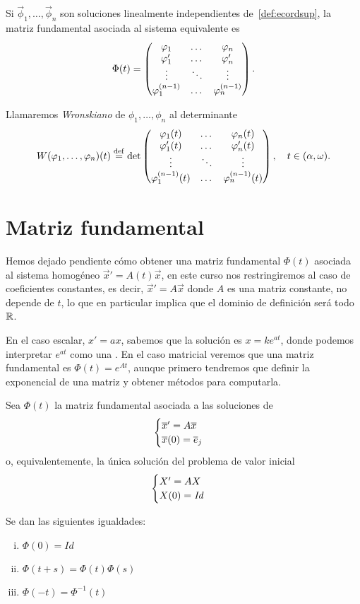\documentclass[../ecuaciones_diferenciales.tex]{subfiles}
\begin{document}
Si \(\vec{\phi}_1, \dots, \vec{\phi}_n\) son soluciones linealmente 
independientes de~\ref{def:ecordsup}, la matriz fundamental asociada al 
sistema equivalente es
\[\Phi(t) = \begin{pmatrix}
		\varphi_1 & \dots & \varphi_n \\
		\varphi'_1 & \dots & \varphi'_n \\
		\vdots & \ddots & \vdots \\
		\varphi^{(n - 1)}_1 & \dots & \varphi^{(n - 1)}_n\end{pmatrix}.\]

\begin{definition}[Wronskiano]
	Llamaremos \emph{Wronskiano} de \(\phi_1, \dots, \phi_n\) al determinante
	\[W(\varphi_1, \dots, \varphi_n)(t) \overset{\operatorname{def}}{=} \det\begin{pmatrix}
			\varphi_1(t) & \dots & \varphi_n(t) \\
			\varphi'_1(t) & \dots & \varphi'_n(t) \\
			\vdots & \ddots & \vdots \\
			\varphi^{(n - 1)}_1(t) & \dots & \varphi^{(n - 1)}_n(t) \\
		\end{pmatrix}, \quad t \in (\alpha, \omega).\]
\end{definition}

\section{Matriz fundamental}

Hemos dejado pendiente cómo obtener una matriz fundamental \(\Phi(t)\) asociada
al sistema homogéneo \(\vec{x}' = A(t)\vec{x}\), en este curso nos
restringiremos al caso de coeficientes constantes, es decir,
\(\vec{x}' = A\vec{x}\) donde \(A\) es una matriz constante, no depende de
\(t\), lo que en particular implica que el dominio de definición será todo
\(\mathbb{R}\).

En el caso escalar, \(x' = ax\), sabemos que la solución es \(x = ke^{at}\),
donde podemos interpretar \(e^{at}\) como una 
. 
En el caso matricial veremos que una matriz fundamental es
\(\Phi(t) = e^{At}\), aunque primero tendremos que definir la exponencial de una
matriz y obtener métodos para computarla.

\begin{lemma}
	\label{lem:expphi}
	Sea \(\Phi(t)\) la matriz fundamental asociada a las soluciones de
	\[\begin{cases}
		\overline{x}' = A\overline{x} \\
		\overline{x}(0) = \overline{e}_j\end{cases}\]
	o, equivalentemente, la única solución del problema de valor inicial
	\[\begin{cases}
			X' = AX \\
			X(0) = \mathit{Id}\end{cases}\]

	Se dan las siguientes igualdades:
	\begin{multicols}{3}
		\begin{enumerate}[i)]
			\item \(\displaystyle \Phi(0) = \mathit{Id}\)

			\item \(\displaystyle \Phi(t + s) = \Phi(t) \Phi(s)\)

			\item \(\displaystyle \Phi(-t) = \Phi^{-1}(t)\)
		\end{enumerate}
	\end{multicols}
\end{lemma}
\end{document}
